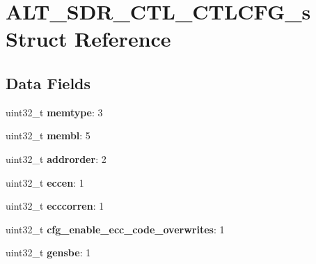 \hypertarget{structALT__SDR__CTL__CTLCFG__s}{}\section{A\+L\+T\+\_\+\+S\+D\+R\+\_\+\+C\+T\+L\+\_\+\+C\+T\+L\+C\+F\+G\+\_\+s Struct Reference}
\label{structALT__SDR__CTL__CTLCFG__s}
\subsection*{Data Fields}
\begin{DoxyCompactItemize}
\item 
\mbox{\label{structALT__SDR__CTL__CTLCFG__s_a02b959e6462fec9d785112a09e4dca37}} 
uint32\+\_\+t {\bfseries memtype}\+: 3
\item 
\mbox{\label{structALT__SDR__CTL__CTLCFG__s_a389210a1265854d56a35535bb697269f}} 
uint32\+\_\+t {\bfseries membl}\+: 5
\item 
\mbox{\label{structALT__SDR__CTL__CTLCFG__s_a6a9476f4eabd18c80d30e66a366469bb}} 
uint32\+\_\+t {\bfseries addrorder}\+: 2
\item 
\mbox{\label{structALT__SDR__CTL__CTLCFG__s_a58958d3542fc317bcaaecd5c63cc9c33}} 
uint32\+\_\+t {\bfseries eccen}\+: 1
\item 
\mbox{\label{structALT__SDR__CTL__CTLCFG__s_a993c4f96fed2bb62a4eced4fc74789f8}} 
uint32\+\_\+t {\bfseries ecccorren}\+: 1
\item 
\mbox{\label{structALT__SDR__CTL__CTLCFG__s_a51852b5fa61e34705e97c58574f234f4}} 
uint32\+\_\+t {\bfseries cfg\+\_\+enable\+\_\+ecc\+\_\+code\+\_\+overwrites}\+: 1
\item 
\mbox{\label{structALT__SDR__CTL__CTLCFG__s_a4324ba9d692ceed95e794608335b9f45}} 
uint32\+\_\+t {\bfseries gensbe}\+: 1
\item 
\mbox{\label{structALT__SDR__CTL__CTLCFG__s_a46476557730424e485dce82eb0507d6d}} 

\end{DoxyCompactItemize}
